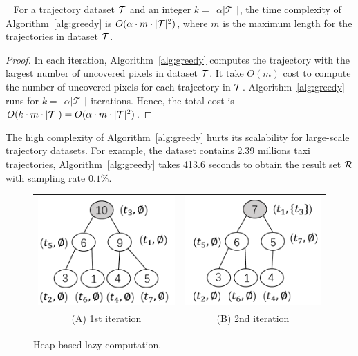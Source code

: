 \begin{lemma}~\label{lem:cost}
For a trajectory dataset $\mathcal{T}$ and an integer $k=\lceil \alpha |\mathcal{T}| \rceil$, the time complexity of Algorithm~\ref{alg:greedy} is $O(\alpha \cdot m \cdot |\mathcal{T}|^2)$,
where $m$ is the maximum length for the trajectories in dataset $\mathcal{T}$.
\end{lemma}


\begin{proof}
In each iteration, Algorithm~\ref{alg:greedy} computes the trajectory with the largest number of uncovered pixels in dataset $\mathcal{T}$.
It take $O(m)$ cost to compute the number of uncovered pixels for each trajectory in $\mathcal{T}$.
Algorithm~\ref{alg:greedy} runs for $k=\lceil \alpha |\mathcal{T}| \rceil$ iterations.
Hence, the total cost is $O(k \cdot m \cdot |\mathcal{T}|)=O(\alpha \cdot m \cdot |\mathcal{T}|^2)$.
\end{proof}

The high complexity of Algorithm~\ref{alg:greedy} hurts its scalability for large-scale trajectory datasets.
For example, the \pt{} dataset contains 2.39 millions taxi trajectories, Algorithm~\ref{alg:greedy} takes 413.6 seconds to obtain the result set $\mathcal{R}$ with sampling rate $0.1\%$.


\begin{figure}
	\centering
	\small
	\begin{tabular}{cc}
		\includegraphics[width=0.4\columnwidth]{pictures/1st}
		&
		\includegraphics[width=0.4\columnwidth]{pictures/2nd}
		\\
		(A) 1st iteration
		&
		(B) 2nd iteration
	\end{tabular}
    \trim
	\caption{Heap-based lazy computation.} \label{fig:heap} %
    \trim \trim
\end{figure}


